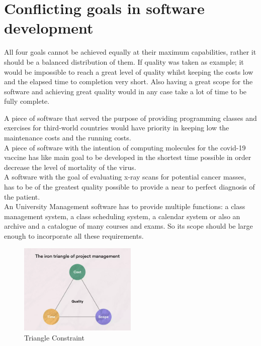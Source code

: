 \chapter{Conflicting goals in software development}
\begin{parlist}
	\item All four goals cannot be achieved equally at their maximum capabilities, rather it should be a balanced distribution of them. If quality was taken as example; it would be impossible to reach a great level of quality whilst keeping the costs low and the elapsed time to completion  very short. Also having a great scope for the software and achieving great quality would in any case take a lot of time to be fully complete.\cite{Sommerville:1986aa}
	\item A piece of software that served the purpose of providing programming classes and exercises for third-world countries would have priority in keeping low the maintenance costs and the  running costs. \\ A piece of software with the intention of computing molecules for the covid-19 vaccine has like main goal to be developed in the shortest time possible in order decrease the level of mortality of the virus. \\ A software with the goal of evaluating x-ray scans for potential cancer masses, has to be of the greatest quality possible to provide a near to perfect diagnosis of the patient.\\ An University Management software has to provide multiple functions: a class management system, a class scheduling system, a calendar system or also an archive and a catalogue of many courses and exams. So its scope  should be large enough to incorporate all these requirements. \\
	\begin{figure}[hbt]
  \centering\includegraphics[width=0.5\textwidth]{Immagini/pm.png}
  \caption{Triangle Constraint}
  \label{fig1}
\end{figure}


\end{parlist}
